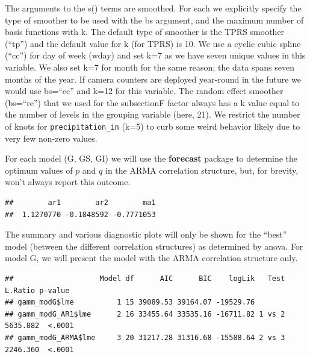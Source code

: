 \documentclass[
]{book}
\newenvironment{Shaded}{\begin{snugshade}}{\end{snugshade}}
\newcommand{\AttributeTok}[1]{\textcolor[rgb]{0.77,0.63,0.00}{#1}}
\newcommand{\DocumentationTok}[1]{\textcolor[rgb]{0.56,0.35,0.01}{\textbf{\textit{#1}}}}
\newcommand{\FunctionTok}[1]{\textcolor[rgb]{0.00,0.00,0.00}{#1}}
\newcommand{\NormalTok}[1]{#1}
\newcommand{\OtherTok}[1]{\textcolor[rgb]{0.56,0.35,0.01}{#1}}
\newcommand{\SpecialCharTok}[1]{\textcolor[rgb]{0.00,0.00,0.00}{#1}}
\newcommand{\StringTok}[1]{\textcolor[rgb]{0.31,0.60,0.02}{#1}}
\begin{document}
The arguments to the s() terms are smoothed. For each we explicitly specify the type of smoother to be used with the bs argument, and the maximum number of basis functions with k. The default type of smoother is the TPRS smoother (``tp'') and the default value for k (for TPRS) is 10. We use a cyclic cubic spline (``cc'') for day of week (wday) and set k=7 as we have seven unique values in this variable. We also set k=7 for month for the same reason; the data spans seven months of the year. If camera counters are deployed year-round in the future we would use bs=``cc'' and k=12 for this variable. The random effect smoother (bs=``re'') that we used for the subsectionF factor always has a k value equal to the number of levels in the grouping variable (here, 21). We restrict the number of knots for \texttt{precipitation\_in} (k=5) to curb some weird behavior likely due to very few non-zero values.

For each model (G, GS, GI) we will use the \textbf{forecast} package to determine the optimum values of \(p\) and \(q\) in the ARMA correlation structure, but, for brevity, won't always report this outcome.

\begin{Shaded}
\end{Shaded}

\begin{verbatim}
##        ar1        ar2        ma1 
##  1.1270770 -0.1848592 -0.7771053
\end{verbatim}

The summary and various diagnostic plots will only be shown for the ``best'' model (between the different correlation structures) as determined by anova. For model G, we will present the model with the ARMA correlation structure only.

\begin{verbatim}
##                    Model df      AIC      BIC    logLik   Test  L.Ratio p-value
## gamm_modG$lme          1 15 39089.53 39164.07 -19529.76                        
## gamm_modG_AR1$lme      2 16 33455.64 33535.16 -16711.82 1 vs 2 5635.882  <.0001
## gamm_modG_ARMA$lme     3 20 31217.28 31316.68 -15588.64 2 vs 3 2246.360  <.0001
\end{verbatim}
\end{document}

